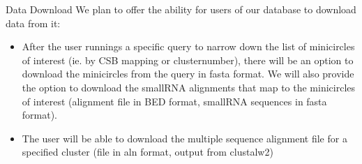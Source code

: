 \documentclass[a4paper,10pt,notitlepage]{article}
\begin{document}
\begin{section}{Data Download}
    We plan to offer the ability for users of our database to download data from it:

    \begin{itemize}
        \item After the user runnings a specific query to narrow down the list of minicircles of interest (ie. by CSB mapping or 
            clusternumber), there will be an option to download the minicircles from the query in fasta format. We will also 
            provide the option to download the smallRNA alignments that map to the minicircles of interest (alignment file in 
            BED format, smallRNA sequences in fasta format). 
        \item The user will be able to download the multiple sequence alignment file for a specified cluster (file in aln 
            format, output from clustalw2)
    \end{itemize}

\end{section}



    



        
            
\end{document}
